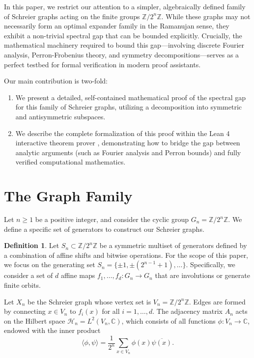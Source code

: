 \documentclass[11pt, a4paper]{article}
\theoremstyle{definition}
\newtheorem{definition}[theorem]{Definition}
\newcommand{\Z}{\mathbb{Z}}
\newcommand{\C}{\mathbb{C}}
\begin{document}
In this paper, we restrict our attention to a simpler, algebraically defined family of Schreier graphs acting on the finite groups $\Z/2^n\Z$. While these graphs may not necessarily form an optimal expander family in the Ramanujan sense, they exhibit a non-trivial spectral gap that can be bounded explicitly. Crucially, the mathematical machinery required to bound this gap---involving discrete Fourier analysis, Perron-Frobenius theory, and symmetry decompositions---serves as a perfect testbed for formal verification in modern proof assistants.

Our main contribution is two-fold:
\begin{enumerate}
    \item We present a detailed, self-contained mathematical proof of the spectral gap for this family of Schreier graphs, utilizing a decomposition into symmetric and antisymmetric subspaces.
    \item We describe the complete formalization of this proof within the Lean 4 interactive theorem prover \cite{moura2021lean}, demonstrating how to bridge the gap between analytic arguments (such as Fourier analysis and Perron bounds) and fully verified computational mathematics.
\end{enumerate}

\section{The Graph Family}

Let $n \ge 1$ be a positive integer, and consider the cyclic group $G_n = \Z/2^n\Z$. We define a specific set of generators to construct our Schreier graphs. 

\begin{definition}
Let $S_n \subset \Z/2^n\Z$ be a symmetric multiset of generators defined by a combination of affine shifts and bitwise operations. For the scope of this paper, we focus on the generating set $S_n = \{ \pm 1, \pm (2^{n-1} + 1), \dots \}$. Specifically, we consider a set of $d$ affine maps $f_1, \dots, f_d : G_n \to G_n$ that are involutions or generate finite orbits.
\end{definition}

Let $X_n$ be the Schreier graph whose vertex set is $V_n = \Z/2^n\Z$. Edges are formed by connecting $x \in V_n$ to $f_i(x)$ for all $i = 1, \dots, d$. The adjacency matrix $A_n$ acts on the Hilbert space $\mathcal{H}_n = L^2(V_n, \C)$, which consists of all functions $\phi : V_n \to \C$, endowed with the inner product
\begin{equation}
    \langle \phi, \psi \rangle = \frac{1}{2^n} \sum_{x \in V_n} \phi(x) \overline{\psi(x)}.
\end{equation}
\end{document}
